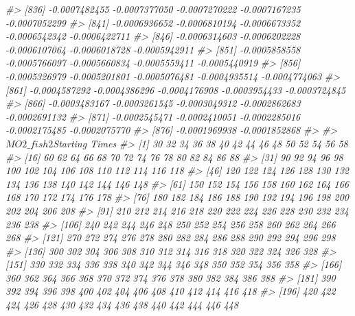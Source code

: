 \documentclass[
]{article}
\newenvironment{Shaded}{\begin{snugshade}}{\end{snugshade}}
\newcommand{\CommentTok}[1]{\textcolor[rgb]{0.56,0.35,0.01}{\textit{#1}}}
\begin{document}
\begin{Shaded}
\begin{Highlighting}[]
\CommentTok{\#\textgreater{} [836] {-}0.0007482455 {-}0.0007377050 {-}0.0007270222 {-}0.0007167235 {-}0.0007052299}
\CommentTok{\#\textgreater{} [841] {-}0.0006936652 {-}0.0006810194 {-}0.0006673352 {-}0.0006542342 {-}0.0006422711}
\CommentTok{\#\textgreater{} [846] {-}0.0006314603 {-}0.0006202228 {-}0.0006107064 {-}0.0006018728 {-}0.0005942911}
\CommentTok{\#\textgreater{} [851] {-}0.0005858558 {-}0.0005766097 {-}0.0005660834 {-}0.0005559411 {-}0.0005440919}
\CommentTok{\#\textgreater{} [856] {-}0.0005326979 {-}0.0005201801 {-}0.0005076481 {-}0.0004935514 {-}0.0004774063}
\CommentTok{\#\textgreater{} [861] {-}0.0004587292 {-}0.0004386296 {-}0.0004176908 {-}0.0003954433 {-}0.0003724845}
\CommentTok{\#\textgreater{} [866] {-}0.0003483167 {-}0.0003261545 {-}0.0003049312 {-}0.0002862683 {-}0.0002691132}
\CommentTok{\#\textgreater{} [871] {-}0.0002545471 {-}0.0002410051 {-}0.0002285016 {-}0.0002175485 {-}0.0002075770}
\CommentTok{\#\textgreater{} [876] {-}0.0001969938 {-}0.0001852868}
\CommentTok{\#\textgreater{} }
\CommentTok{\#\textgreater{} $MO2\_fish2$\textasciigrave{}Starting Times\textasciigrave{}}
\CommentTok{\#\textgreater{}   [1]   30   32   34   36   38   40   42   44   46   48   50   52   54   56   58}
\CommentTok{\#\textgreater{}  [16]   60   62   64   66   68   70   72   74   76   78   80   82   84   86   88}
\CommentTok{\#\textgreater{}  [31]   90   92   94   96   98  100  102  104  106  108  110  112  114  116  118}
\CommentTok{\#\textgreater{}  [46]  120  122  124  126  128  130  132  134  136  138  140  142  144  146  148}
\CommentTok{\#\textgreater{}  [61]  150  152  154  156  158  160  162  164  166  168  170  172  174  176  178}
\CommentTok{\#\textgreater{}  [76]  180  182  184  186  188  190  192  194  196  198  200  202  204  206  208}
\CommentTok{\#\textgreater{}  [91]  210  212  214  216  218  220  222  224  226  228  230  232  234  236  238}
\CommentTok{\#\textgreater{} [106]  240  242  244  246  248  250  252  254  256  258  260  262  264  266  268}
\CommentTok{\#\textgreater{} [121]  270  272  274  276  278  280  282  284  286  288  290  292  294  296  298}
\CommentTok{\#\textgreater{} [136]  300  302  304  306  308  310  312  314  316  318  320  322  324  326  328}
\CommentTok{\#\textgreater{} [151]  330  332  334  336  338  340  342  344  346  348  350  352  354  356  358}
\CommentTok{\#\textgreater{} [166]  360  362  364  366  368  370  372  374  376  378  380  382  384  386  388}
\CommentTok{\#\textgreater{} [181]  390  392  394  396  398  400  402  404  406  408  410  412  414  416  418}
\CommentTok{\#\textgreater{} [196]  420  422  424  426  428  430  432  434  436  438  440  442  444  446  448}

\end{Highlighting}
\end{Shaded}
\end{document}
